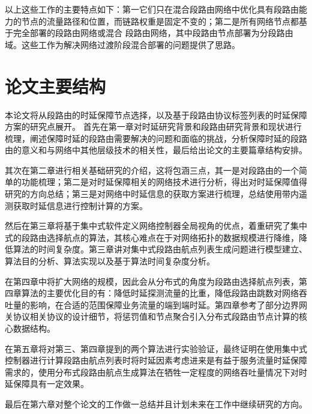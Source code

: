 以上这些工作的主要特点如下：第一它们只在混合段路由网络中优化具有段路由能力的节点的流量路径和位置，而链路权重是固定不变的；第二是所有网络节点都基于完全部署的段路由网络或混合 段路由网络，其中段路由节点部署为分段路由域。这些工作为解决网络过渡阶段混合部署的问题提供了思路。

\section{论文主要结构}

本论文将从段路由的时延保障节点选择，以及基于段路由协议标签列表的时延保障方案的研究点展开。
首先在第一章对时延研究背景和段路由研究背景和现状进行梳理，阐述保障时延的段路由需要解决的问题和面临的挑战，分析保障时延的段路由的意义和与网络中其他层级技术的相关性，最后给出论文的主要篇章结构安排。

其次在第二章进行相关基础研究的介绍，这将包涵三点，其一是对段路由的一个简单的功能梳理；第二是对时延保障相关的网络技术进行分析，得出对时延保障值得研究的方向总结；第三是对网络中时延信息的获取方案进行梳理，总结使用带内遥测获取时延信息进行控制计算的方案。

然后在第三章将基于集中式软件定义网络控制器全局视角的优点，着重研究了集中式的段路由选择航点的算法，其核心难点在于对网络拓扑的数据规模进行降维，降低算法的时间复杂度。第三章讲对集中式段路由航点列表生成问题进行模型建立、算法目的分析、算法实现以及基于算法时间复杂度分析。

在第四章中将扩大网络的规模，因此会从分布式的角度为段路由选择航点列表，第四章算法的主要优化目的有：降低时延探测流量的比重，降低段路由跳数对网络吞吐量的影响，在合适的范围保障业务流量的端到端时延。第四章参考了部分边界网关协议相关协议的设计细节，将惩罚值和节点聚合引入分布式段路由节点计算的核心数据结构。

在第五章将对第三、第四章提到的两个算法进行实验验证，最终证明在使用集中式控制器进行计算段路由航点列表时将时延因素考虑进来是有益于服务流量时延保障需求的，使用分布式段路由航点生成算法在牺牲一定程度的网络吞吐量情况下对时延保障具有一定效果。

最后在第六章对整个论文的工作做一总结并且计划未来在工作中继续研究的方向。

\ifx\usechapbib\empty
\nocite{BSTcontrol}
\setcounter{NAT@ctr}{0}


\fi
